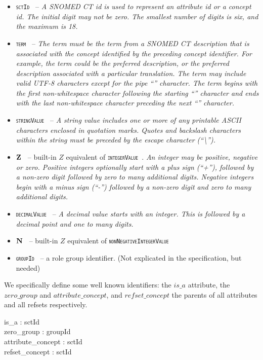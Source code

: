 \documentclass{article}
\def\spec#1{{\tt \small \textsc{{#1}} }}
\def\desc#1{{\small \textsl{{#1}} }}
\begin{document}
\begin{itemize}[noitemsep]
\item \spec{sctId} -- \desc{A SNOMED CT id is used to represent an attribute id or a concept id.  The initial digit may not be zero. The smallest number of digits is six, and the maximum is 18.}
\item \spec{term} --  \desc{The term must be the term from a SNOMED CT description that is associated with the concept identified by the preceding concept identifier. For example, the term could be the preferred description, or the preferred description associated with a particular translation. The term may include valid UTF-8 characters except for the pipe ``\textbar'' character. The term begins with the first non-whitespace character following the starting ``\textbar'' character and ends with the last non-whitespace character preceding the next ``\textbar'' character.}
\item \spec{stringValue} -- \desc{A string value includes one or more of any printable ASCII characters enclosed in quotation marks. Quotes and backslash characters within the string must be preceded by the escape character (``\textbackslash'').}
\item \spec{${\mathbf{Z}}$} -- built-in $Z$ equivalent of \spec{integerValue}. \desc{An integer may be positive, negative or zero. Positive integers optionally start with a plus sign (``+''), followed by a non-zero digit followed by zero to many additional digits. Negative integers begin with a minus sign (``-'') followed by a non-zero digit and zero to many additional digits.}
\item \spec{decimalValue} --  \desc{A decimal value starts with an integer. This is followed by a decimal point and one to many digits.}
\item \spec{${\mathbf{N}}$} -- built-in $Z$ equivalent of \spec{nonNegativeIntegerValue}
\item \spec{groupId} -- a role group identifier.  (Not explicated in the specification, but needed)
\end{itemize}

\begin{zed}
\end{zed}


We specifically define some well known identifiers: the $is\_a$ attribute, the $zero\_group$ and  $attribute\_concept$, and $refset\_concept$ the parents of all attributes and all refsets respectively.
\begin{axdef}
is\_a : sctId \\
zero\_group : groupId \\
attribute\_concept : sctId \\
refset\_concept : sctId
\end{axdef}
\end{document}
